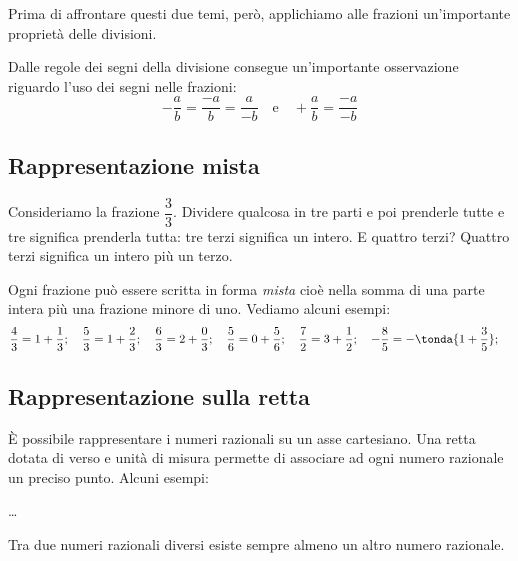 Prima di affrontare questi due temi, però, applichiamo alle frazioni
un'importante proprietà delle divisioni.

\begin{osservazione}
 Dalle regole dei segni della divisione consegue un'importante osservazione
riguardo l'uso dei segni nelle frazioni:
\[-\dfrac{a}{b} = \dfrac{-a}{b} = \dfrac{a}{-b} \quad \text{e} \quad
  +\dfrac{a}{b} = \dfrac{-a}{-b}
\]
\end{osservazione}

\subsection{Rappresentazione mista}
\label{sub:razionali_rappresentazione_mista}

Consideriamo la frazione \(\dfrac{3}{3}\). Dividere qualcosa in tre parti e
poi prenderle tutte e tre significa prenderla tutta: tre terzi significa
un intero. E quattro terzi? Quattro terzi significa un intero più un terzo.

Ogni frazione può essere scritta in forma \emph{mista} cioè nella somma di
una parte intera più una frazione minore di uno. Vediamo alcuni esempi:
\[\frac{4}{3} = 1 + \frac{1}{3}; \quad
\frac{5}{3} = 1 + \frac{2}{3}; \quad
\frac{6}{3} = 2 + \frac{0}{3}; \quad
\frac{5}{6} = 0 + \frac{5}{6}; \quad
\frac{7}{2} = 3 + \frac{1}{2}; \quad
-\frac{8}{5} = -\tonda{1 + \frac{3}{5}}; \quad
\]

\subsection{Rappresentazione sulla retta}
\label{sub:razionali_rappresentazione_retta}

È possibile rappresentare i numeri razionali su un asse cartesiano. Una
retta dotata di verso e unità di misura permette di associare ad ogni
numero razionale un preciso punto. Alcuni esempi:

\begin{center}
  \dots                                                          %
\end{center}

\begin{teorema}
 Tra due numeri razionali diversi esiste sempre almeno un altro numero
razionale.
\end{teorema}

